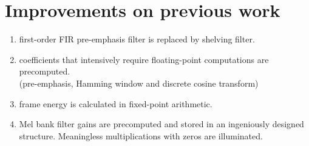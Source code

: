 
\section{Improvements on previous work}

\begin{enumerate}
\item first-order FIR pre-emphasis filter is replaced by shelving filter.
\item coefficients that intensively require floating-point computations are precomputed.\\(pre-emphasis, Hamming window and discrete cosine transform)
\item frame energy is calculated in fixed-point arithmetic.
\item Mel bank filter gains are precomputed and stored in an ingeniously designed structure. Meaningless multiplications with zeros are illuminated.
\end{enumerate}

